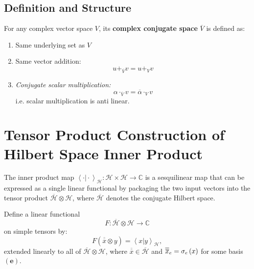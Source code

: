 \documentclass[aps,preprint]{revtex4}
\begin{document}
\subsection{Definition and Structure}

For any complex vector space $V$, its \textbf{complex conjugate space} $%
\overline{V}$ is defined as:

\begin{enumerate}
\item Same underlying set as $V$

\item Same vector addition: 
\begin{equation}
u+_{\overline{V}}v=u+_{V}v
\end{equation}

\item \emph{Conjugate scalar multiplication: }%
\begin{equation}
\alpha \cdot _{\overline{V}}v=\overline{\alpha }\cdot _{V}v
\end{equation}
i.e. scalar multiplication is anti linear.
\end{enumerate}

\section{Tensor Product Construction of Hilbert Space Inner Product}

The inner product map $\left\langle \left. \cdot \right\vert \cdot
\right\rangle _{\mathcal{H}}:\mathcal{H}\times \mathcal{H}\rightarrow 
\mathbb{C}$ is a sesquilinear map that can be expressed as a single linear
functional by packaging the two input vectors into the tensor product $%
\overline{\mathcal{H}}\otimes \mathcal{H}$, where $\overline{\mathcal{H}}$
denotes the conjugate Hilbert space.

Define a linear functional 
\begin{equation}
F:\overline{\mathcal{H}}\otimes \mathcal{H}\rightarrow \mathbb{C}
\end{equation}%
on simple tensors by: 
\begin{equation}
F(\overline{\overline{x}}\otimes y)=\left\langle \left. x\right\vert
y\right\rangle _{\mathcal{H}},
\end{equation}%
extended linearly to all of $\overline{\mathcal{H}}\otimes \mathcal{H}$,
where $\overline{\overline{x}}\in \overline{\mathcal{H}}$ and $\overline{%
\overline{x}}_{e}=\sigma _{e}\left( x\right) $ for some basis $\left( 
\boldsymbol{e}\right) $.
\end{document}
